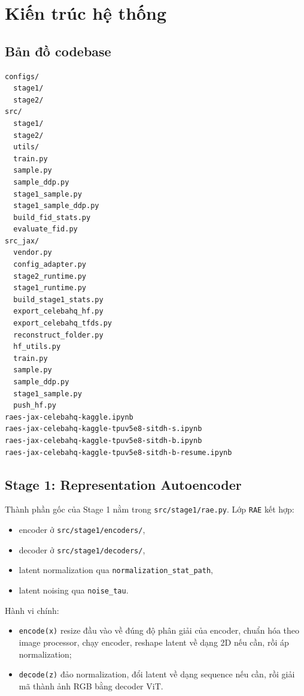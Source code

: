 \section{Kiến trúc hệ thống}

\subsection{Bản đồ codebase}

\begin{lstlisting}[style=rae]
configs/
  stage1/
  stage2/
src/
  stage1/
  stage2/
  utils/
  train.py
  sample.py
  sample_ddp.py
  stage1_sample.py
  stage1_sample_ddp.py
  build_fid_stats.py
  evaluate_fid.py
src_jax/
  vendor.py
  config_adapter.py
  stage2_runtime.py
  stage1_runtime.py
  build_stage1_stats.py
  export_celebahq_hf.py
  export_celebahq_tfds.py
  reconstruct_folder.py
  hf_utils.py
  train.py
  sample.py
  sample_ddp.py
  stage1_sample.py
  push_hf.py
raes-jax-celebahq-kaggle.ipynb
raes-jax-celebahq-kaggle-tpuv5e8-sitdh-s.ipynb
raes-jax-celebahq-kaggle-tpuv5e8-sitdh-b.ipynb
raes-jax-celebahq-kaggle-tpuv5e8-sitdh-b-resume.ipynb
\end{lstlisting}

\subsection{Stage 1: Representation Autoencoder}

Thành phần gốc của Stage 1 nằm trong \texttt{src/stage1/rae.py}. Lớp
\texttt{RAE} kết hợp:

\begin{itemize}[leftmargin=1.5em]
  \item encoder ở \texttt{src/stage1/encoders/},
  \item decoder ở \texttt{src/stage1/decoders/},
  \item latent normalization qua \texttt{normalization\_stat\_path},
  \item latent noising qua \texttt{noise\_tau}.
\end{itemize}

Hành vi chính:

\begin{itemize}[leftmargin=1.5em]
  \item \texttt{encode(x)} resize đầu vào về đúng độ phân giải của encoder,
  chuẩn hóa theo image processor, chạy encoder, reshape latent về dạng 2D nếu
  cần, rồi áp normalization;
  \item \texttt{decode(z)} đảo normalization, đổi latent về dạng sequence nếu
  cần, rồi giải mã thành ảnh RGB bằng decoder ViT.
\end{itemize}

